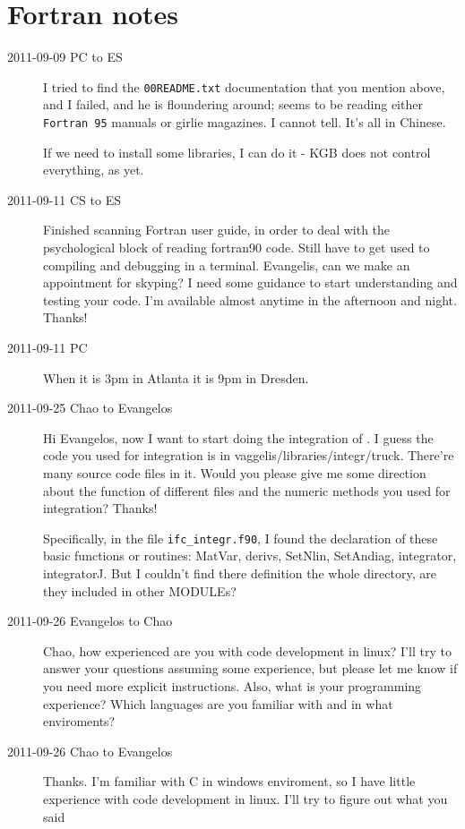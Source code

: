 \section{Fortran notes}
\label{s:fortran}

\begin{description}

\item[2011-09-09 PC to ES]
I tried to find the \texttt{00README.txt} documentation that you mention
above, and I failed, and he is floundering around; seems to be reading
either \texttt{Fortran 95} manuals or girlie magazines. I cannot tell.
It's all in Chinese.

If we need to install some libraries, I can do it - KGB does not control
everything, as yet.


\item[2011-09-11 CS to ES] Finished scanning Fortran user guide, in order
to deal with the psychological block of reading fortran90 code. Still
have to get used to compiling and debugging in a terminal. Evangelis, can
we make an appointment for skyping? I need some guidance to start
understanding and testing your code. I'm available almost anytime in the
afternoon and night. Thanks!

\item[2011-09-11 PC] When it is 3pm in Atlanta it is 9pm in Dresden.

\item[2011-09-25 Chao to Evangelos]
Hi Evangelos, now I want to start doing the integration of \KSe. I guess the code you used for integration is in vaggelis/libraries/integr/truck. There're many source code files in it. Would you please give me some direction about the function of different files and the numeric methods you used for integration? Thanks!

Specifically, in the file \texttt{ifc\_integr.f90}, I found the declaration of these basic functions or routines: MatVar, derivs, SetNlin, SetAndiag, integrator, integratorJ. But I couldn't find there definition the whole directory, are they included in other MODULEs?

\item[2011-09-26 Evangelos to Chao] Chao, how experienced are you with
code development in linux? I'll try to answer your questions assuming some
experience, but please let me know if you need more explicit instructions.
Also, what is your programming experience? Which languages are you familiar
with and in what enviroments?

\item[2011-09-26 Chao to Evangelos] Thanks. I'm familiar with C in windows enviroment, so I have little experience with code development in linux. I'll try to figure out what you said


\end{description}

